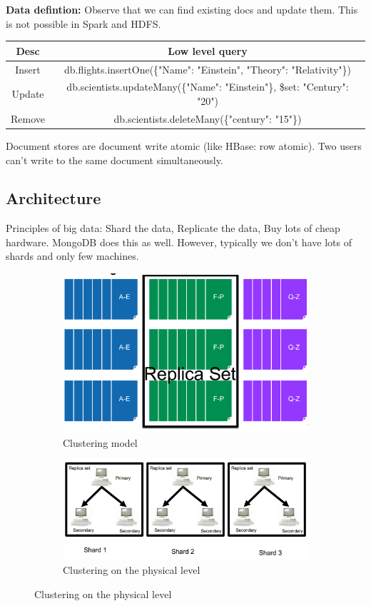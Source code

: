 \documentclass[11pt,oneside,a4paper]{article}
\begin{document}
\textbf{Data defintion:} Observe that we can find existing docs and update them. This is not possible in Spark and HDFS.

\begin{table}
\centering
\begin{tabular}{|c|c|}
	\hline 
	Desc & Low level query \\ 
	\hline 
	Insert & db.flights.insertOne(\{"Name": "Einstein", "Theory": "Relativity"\}) \\ 
	\hline 
	Update & db.scientists.updateMany(\{"Name": "Einstein"\},
	{ \$set: {"Century": "20"}}) \\ 
	\hline 
	Remove & db.scientists.deleteMany(\{"century": "15"\}) \\ 
	\hline 
\end{tabular} 
\end{table}


Document stores are document write atomic (like HBase: row atomic). Two users can't write to the same document simultaneously.

\subsection{Architecture}

Principles of big data:  Shard the data, Replicate the data,  Buy lots of cheap hardware. MongoDB does this as well. However, typically we don't have lots of shards and only few machines.

\begin{figure}[hb!]
	\centering
	\begin{subfigure}[t]{.5\textwidth}
		\centering
		\includegraphics[width=0.6\linewidth]{figures/docstores_clustering}
		\caption{Clustering model}
	\end{subfigure}%
	\begin{subfigure}[t]{.5\textwidth}
		\centering
		\includegraphics[width=0.8\linewidth]{figures/docstores_clustering_phys}
		\caption{Clustering on the physical level}
	\end{subfigure}
\end{figure}
\end{document}
